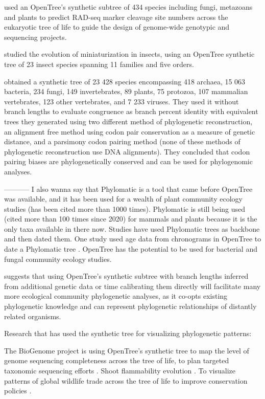 \documentclass[oupdraft]{sysbio_sse}
\begin{document}
\citep{herrera2015predicting} used an OpenTree's synthetic subtree of 434 species
including fungi, metazoans and plants to predict RAD-seq marker cleavage site numbers
across the eukaryotic tree of life to guide the design of genome-wide genotypic and
sequencing projects.

\citep{polilov2017scaling} studied the evolution of miniaturization in insects, using
an OpenTree synthetic tree of 23 insect species spanning 11 families and five orders.

\citep{miller2020codonpairs} obtained a synthetic tree of 23 428 species encompassing
418 archaea, 15 063 bacteria, 234 fungi, 149 invertebrates, 89 plants, 75 protozoa,
107 mammalian vertebrates, 123 other vertebrates, and 7 233 viruses.
They used it without branch lengths to evaluate congruence as branch percent identity
with equivalent trees they generated using two different method of phylogenetic reconstruction,
an alignment free method using codon pair conservation as a measure of genetic distance,
 and a parsimony codon pairing method (none of these methods of phylogenetic
 reconstruction use DNA alignments).
 They concluded that codon pairing biases are phylogenetically conserved and can
 be used for phylogenomic analyses.

-----------
I also wanna say that Phylomatic \citep{webb2005phylomatic} is a tool that came before
OpenTree was available, and it has been used for a wealth of plant community ecology
studies (has been cited more than 1000 times).
Phylomatic is still being used (cited more than 100 times since 2020) for mammals
and plants because it is the only taxa available in there now.
Studies have used Phylomatic trees as backbone and then dated them. One study used
age data from chronograms in OpenTree to date a Phylomatic tree \citep{}.
OpenTree has the potential to be used for bacterial and fungal community ecology studies.

\citep{jantzen2019effects} suggests that using OpenTree's synthetic subtree with
branch lengths inferred from additional genetic data or time calibrating them directly
will facilitate many more ecological community phylogenetic analyses, as it co-opts existing
phylogenetic knowledge and can represent phylogenetic relationships of distantly related organisms.

Research that has used the synthetic tree for visualizing phylogenetic patterns:

The BioGenome project is using OpenTree’s synthetic tree to map the level of genome
sequencing completeness across the tree of life, to plan targeted taxonomic sequencing
efforts \citep{lewin2018earth}.
Shoot flammability evolution \citep{cui2020shoot}.
To visualize patterns of global wildlife trade across the tree of life to improve
conservation policies \citep{fukushima2020global}.
\end{document}
